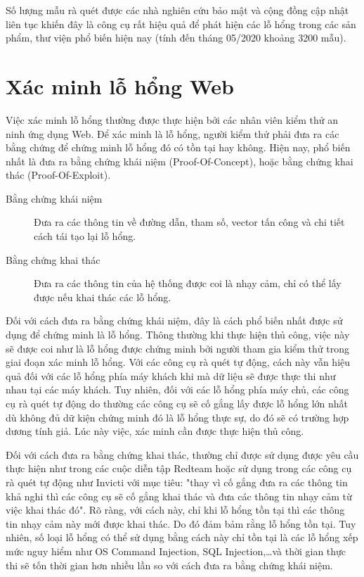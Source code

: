 \documentclass[./../main.tex]{subfiles}
\begin{document}
Số lượng mẫu rà quét được các nhà nghiên cứu bảo mật và cộng đồng cập nhật liên tục
khiến đây là công cụ rất hiệu quả để phát hiện các lỗ hổng trong các sản phẩm,
thư viện phổ biến hiện nay (tính đến tháng 05/2020 khoảng 3200 mẫu).


\section{Xác minh lỗ hổng Web}

Việc xác minh lỗ hổng thường được thực hiện bởi các nhân viên kiểm thử an ninh ứng dụng Web. Để xác minh là lỗ hổng, người kiểm thử phải đưa ra các bằng chứng để chứng minh lỗ hổng đó có tồn tại hay không. Hiện nay, phổ biến nhất là đưa ra bằng chứng khái niệm (Proof-Of-Concept), hoặc bằng chứng khai thác (Proof-Of-Exploit).
\begin{description}
	\item[Bằng chứng khái niệm] Đưa ra các thông tin về đường dẫn, tham số, vector tấn công và chi tiết cách tái tạo lại lỗ hổng.
	\item[Bằng chứng khai thác] Đưa ra các thông tin của hệ thống được coi là nhạy cảm, chỉ có thể lấy được nếu khai thác các lỗ hổng.
\end{description}

Đối với cách đưa ra bằng chứng khái niệm, đây là cách phổ biến nhất được sử dụng để chứng minh là lỗ hổng. Thông thường khi thực hiện thủ công, việc này sẽ được coi như là lỗ hổng được chứng minh bởi người tham gia kiểm thử trong giai đoạn xác minh lỗ hổng. Với các công cụ rà quét tự động, cách này vẫn hiệu quả đối với các lỗ hổng phía máy khách khi mà dữ liệu sẽ được thực thi như nhau tại các máy khách. Tuy nhiên, đối với các lỗ hổng phía máy chủ, các công cụ rà quét tự động do thường các công cụ sẽ cố gắng lấy được lỗ hổng lớn nhất dù không đủ dữ kiện chứng minh đó là lỗ hổng thực sự, do đó sẽ có trường hợp dương tính giả. Lúc này việc, xác minh cần được thực hiện thủ công.

Đối với cách đưa ra bằng chứng khai thác, thường chỉ được sử dụng được yêu cầu thực hiện như trong các cuộc diễn tập Redteam hoặc sử dụng trong các công cụ rà quét tự động như Invicti với mục tiêu: "thay vì cố gắng đưa ra các thông tin khả nghi thì các công cụ sẽ cố gắng khai thác và đưa các thông tin nhạy cảm từ việc khai thác đó". Rõ ràng, với cách này, chỉ khi lỗ hổng tồn tại thì các thông tin nhạy cảm này mới được khai thác. Do đó đảm bảm rằng lỗ hổng tồn tại. Tuy nhiên, số loại lỗ hổng có thể sử dụng bằng cách này chỉ tồn tại là các lỗ hổng xếp mức nguy hiểm như OS Command Injection, SQL Injection,\ldots và thời gian thực thi sẽ tốn thời gian hơn nhiều lần so với cách đưa ra bằng chứng khái niệm.
\end{document}
